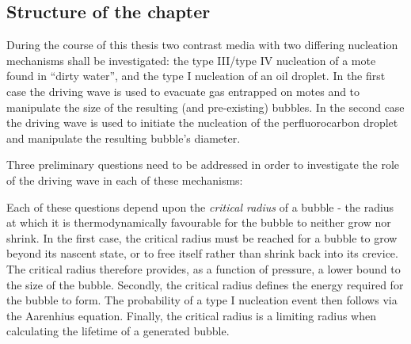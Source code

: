 \subsection{Structure of the chapter}


During the course of this thesis two contrast media with two differing nucleation mechanisms shall be investigated:
the type III/type IV nucleation of a mote found in ``dirty water'',
and the type I nucleation of an oil droplet.
In the first case the driving wave is used to evacuate gas entrapped on motes
and to manipulate the size of the resulting (and pre-existing) bubbles.
In the second case the driving wave is used to initiate the nucleation of the perfluorocarbon droplet
and manipulate the resulting bubble's diameter.

Three preliminary questions need to be addressed in order to investigate the role of the driving wave in each of these mechanisms:

Each of these questions depend upon the  {\em critical radius} of a bubble - the radius at which it is thermodynamically favourable for the bubble to neither grow  nor shrink.
In the first case, the critical radius must be reached for a bubble to grow beyond its nascent state, 
or to free itself rather than shrink back into its crevice.  
The critical radius therefore provides, as a function of pressure,  a lower bound to the size of the bubble.
Secondly, the critical radius defines the energy required for the bubble to form.
The probability of a type I nucleation event then follows via the Aarenhius equation.
Finally, the critical radius is a limiting radius when calculating the lifetime of a generated bubble. %


